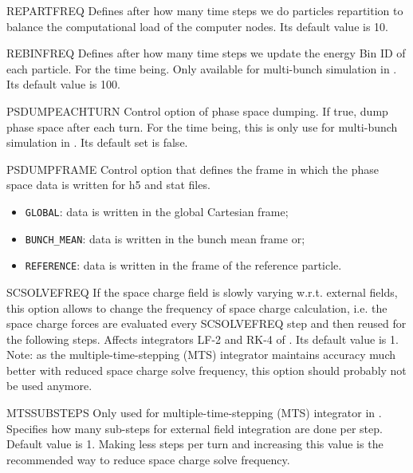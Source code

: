 \begin{kdescription}
  \item[REPARTFREQ]
  Defines after how many time steps we do particles repartition to balance the computational load of
  the computer nodes. Its default value is 10.

  \item[REBINFREQ]
  Defines after how many time steps we update the energy Bin ID of each particle. For the time being.
  Only available for multi-bunch simulation in \opalcycl. Its default value is 100.

  \item[PSDUMPEACHTURN]
  Control option of phase space dumping. If true, dump phase space after each turn.
  For the time being, this is only use for multi-bunch simulation in \opalcycl. Its default set is false.

  \item[PSDUMPFRAME]
  Control option that defines the frame in which the phase space data is written for h5 and stat files.
    \begin{itemize}
      \item \verb|GLOBAL|: data is written in the global Cartesian frame;
      \item \verb|BUNCH_MEAN|: data is written in the bunch mean frame or;
      \item \verb|REFERENCE|: data is written in the frame of the reference particle.
    \end{itemize}

  \item[SCSOLVEFREQ]
  If the space charge field is slowly varying w.r.t. external fields,  this option allows to change the frequency of space charge calculation,
  i.e. the space charge forces are evaluated every SCSOLVEFREQ step and then reused for the following steps. Affects integrators LF-2 and RK-4 of \opalcycl. Its default value is 1. Note: as the multiple-time-stepping (MTS) integrator maintains accuracy much better with reduced space charge solve frequency, this option should probably not be used anymore.

  \item[MTSSUBSTEPS]
  Only used for multiple-time-stepping (MTS) integrator in \opalcycl. Specifies how many sub-steps for external field integration are done per step. Default value is 1.
  Making less steps per turn and increasing this value is the recommended way to reduce space charge solve frequency.


\end{kdescription}

